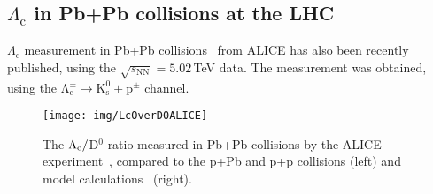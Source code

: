 % 

\subsection{$\Lambda_\mathrm{c}$ in Pb+Pb collisions at the LHC}

$\Lambda_\mathrm{c}$ measurement in Pb+Pb collisions~\cite{AlicePbPb} from ALICE has also been recently published, using the $\sqrt{s_\mathrm{NN}} = 5.02\,$TeV data. The measurement was obtained, using the $\mathrm{\Lambda_c^\pm \rightarrow K^0_s + p^\pm}$ channel.

\begin{figure}[!htb]
\centering
\texttt{[image: img/LcOverD0ALICE]}
\caption[The $\Lambdac/$D$^0$ ratio measured in Pb+Pb collisions by the ALICE experiment, compared to the p+Pb and p+p collisions and model calculations.]{The $\Lambdac/$D$^0$ ratio measured in Pb+Pb collisions by the ALICE experiment~\cite{AlicePbPb}, compared to the p+Pb and p+p collisions (left) and model calculations~\cite{fragmentationAA, Catania, LcPPbModelShaoSong, ShaoSongPP,  ShaoSong} (right).}
\label{fig:LcD0ALICE}
\end{figure}

